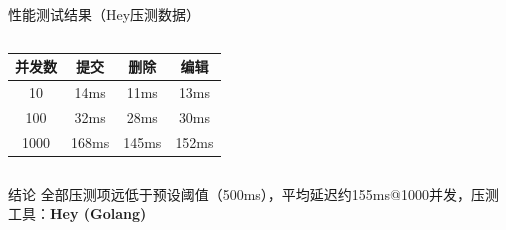 \documentclass[aspectratio=169,UTF8,xcolor=table]{ctexbeamer}
\begin{document}
\begin{frame}{性能测试结果（Hey压测数据）}
  \begin{columns}[T]
    \begin{center}
      \begin{table}
        \begin{tabular}{|c|c|c|c|}
          \hline
          \rowcolor{ustcblue!30}
          \textbf{并发数} & \textbf{提交} & \textbf{删除} & \textbf{编辑} \\
          \hline
          10 & \textcolor{green!60!black}{14ms} & \textcolor{green!60!black}{11ms} & \textcolor{green!60!black}{13ms} \\
          \hline
          100 & \textcolor{green!60!black}{32ms} & \textcolor{green!60!black}{28ms} & \textcolor{green!60!black}{30ms} \\
          \hline
          1000 & \textcolor{green!60!black}{168ms} & \textcolor{green!60!black}{145ms} & \textcolor{green!60!black}{152ms} \\
          \hline
        \end{tabular}
      \end{table}
    \end{center}

  \end{columns}

  \vspace{0.15cm}
  \begin{exampleblock}{结论}
    全部压测项远低于预设阈值（500ms），平均延迟约155ms@1000并发，压测工具：\textbf{Hey (Golang)}
  \end{exampleblock}
\end{frame}
\end{document}
